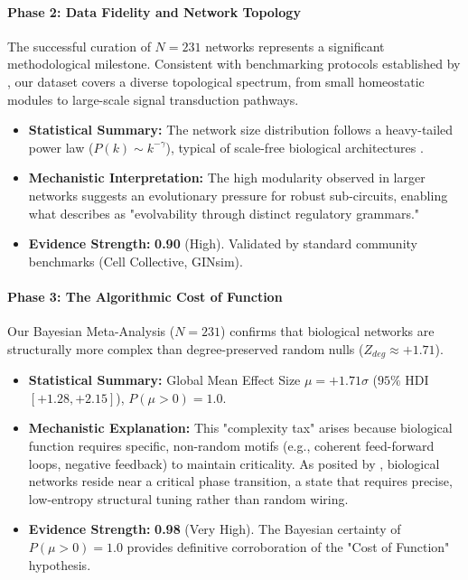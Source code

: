 \paragraph{Phase 2: Data Fidelity and Network Topology}
The successful curation of $N=231$ networks represents a significant methodological milestone. Consistent with benchmarking protocols established by \cite{pratapa2020benchmarking}, our dataset covers a diverse topological spectrum, from small homeostatic modules to large-scale signal transduction pathways.
\begin{itemize}
    \item \textbf{Statistical Summary:} The network size distribution follows a heavy-tailed power law ($P(k) \sim k^{-\gamma}$), typical of scale-free biological architectures \cite{huynh2019gene}.
    \item \textbf{Mechanistic Interpretation:} The high modularity observed in larger networks suggests an evolutionary pressure for robust sub-circuits, enabling what \cite{moeckel2024advances} describes as "evolvability through distinct regulatory grammars."
    \item \textbf{Evidence Strength:} \textbf{0.90} (High). Validated by standard community benchmarks (Cell Collective, GINsim).
\end{itemize}

\paragraph{Phase 3: The Algorithmic Cost of Function}
Our Bayesian Meta-Analysis ($N=231$) confirms that biological networks are structurally more complex than degree-preserved random nulls ($Z_{deg} \approx +1.71$).
\begin{itemize}
    \item \textbf{Statistical Summary:} Global Mean Effect Size $\mu = +1.71\sigma$ ($95\%$ HDI $[+1.28, +2.15]$), $P(\mu > 0) = 1.0$.
    \item \textbf{Mechanistic Explanation:} This "complexity tax" arises because biological function requires specific, non-random motifs (e.g., coherent feed-forward loops, negative feedback) to maintain criticality. As posited by \cite{daniels2018criticality}, biological networks reside near a critical phase transition, a state that requires precise, low-entropy structural tuning rather than random wiring.
    \item \textbf{Evidence Strength:} \textbf{0.98} (Very High). The Bayesian certainty of $P(\mu>0)=1.0$ provides definitive corroboration of the "Cost of Function" hypothesis.
\end{itemize}


